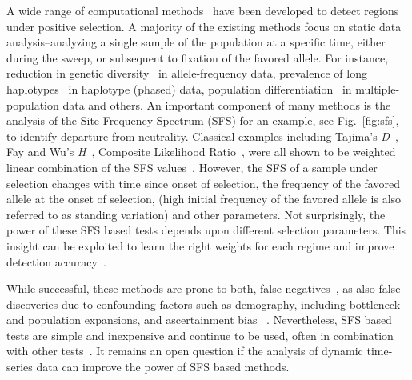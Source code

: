 \documentclass[11pt]{article}
\begin{document}
A wide range of computational methods~\cite{vitti2013detecting} have
been developed to detect regions under positive selection. A majority
of the existing methods focus on static data analysis--analyzing a
single sample of the population at a specific time, either during the
sweep, or subsequent to fixation of the favored allele. For instance,
reduction in genetic
diversity~\cite{tajima1989statistical,fay2000hitchhiking,ronen2013learning}
in allele-frequency data, prevalence of long
haplotypes~\cite{sabeti2006positive,vitti2013detecting} in haplotype
(phased) data, population
differentiation~\cite{holsinger2009genetics,burke2010genome} in
multiple-population data and others. An important component of many
methods is the analysis of the Site Frequency Spectrum (SFS) for an example, 
see 
Fig.~\ref{fig:sfs}, to
identify departure from neutrality. Classical examples including
Tajima's \emph{D}~\cite{tajima1989statistical}, Fay and Wu's
\emph{H}~\cite{fay2000hitchhiking}, Composite Likelihood
Ratio~\cite{nielsen2005genomic}, were all shown to be weighted linear
combination of the SFS values~\cite{achaz2009frequency}. However, the
SFS of a sample under selection changes with time since onset of
selection, the frequency of the favored allele at the onset of
selection, (high initial frequency of the favored allele is also
referred to as standing variation) and other parameters. Not
surprisingly, the power of these SFS based tests depends upon
different selection parameters. This insight can be exploited to learn
the right weights for each regime and improve detection
accuracy~\cite{ronen2013learning}.

While successful, these methods are prone to both, false
negatives~\cite{messer2013population}, as also false-discoveries due
to confounding factors such as demography, including bottleneck and
population expansions, and ascertainment bias ~\cite{ptak2002evidence,
  ramos2002statistical,akey2009constructing,
  nielsen2003correcting,messer2013population}. Nevertheless, SFS based
tests are simple and inexpensive and continue to be used, often in
combination with other
tests~\cite{akey2009constructing,vitti2013detecting}. It remains an
open question if the analysis of dynamic time-series data can improve
the power of SFS based methods.
\end{document}
